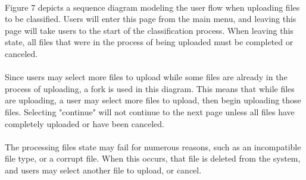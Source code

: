 \documentclass[12pt,oneside,letterpaper]{article}
\begin{document}
 
 \paragraph{} Figure 7 depicts a sequence diagram modeling the user flow when uploading files to be classified. Users will enter this page from the main menu, and leaving this page will take users to the start of the classification process. When leaving this state, all files that were in the process of being uploaded must be completed or canceled.
\paragraph{} Since users may select more files to upload while some files are already in the process of uploading, a fork is used in this diagram. This means that while files are uploading, a user may select more files to upload, then begin uploading those files. Selecting "continue" will not continue to the next page unless all files have completely uploaded or have been canceled.
\paragraph{} The processing files state may fail for numerous reasons, such as an incompatible file type, or a corrupt file. When this occurs, that file is deleted from the system, and users may select another file to upload, or cancel.
 
\end{document}
